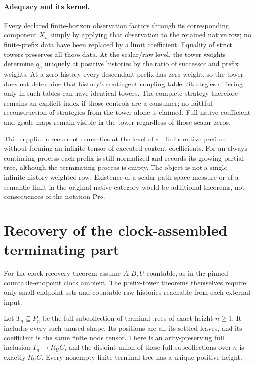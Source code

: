 \documentclass[11pt]{article}
\begin{document}
\paragraph{Adequacy and its kernel.}
Every declared finite-horizon observation factors through its corresponding component $X_n$ simply by applying that observation to the retained native row; no finite-prefix data have been replaced by a limit coefficient. Equality of strict towers preserves all those data. At the scalar/raw level, the tower weights determine $q_h$ uniquely at positive histories by the ratio of successor and prefix weights. At a zero history every descendant prefix has zero weight, so the tower does not determine that history's contingent coupling table. Strategies differing only in such tables can have identical towers. The complete strategy therefore remains an explicit index if those controls are a consumer; no faithful reconstruction of strategies from the tower alone is claimed. Full native coefficient and grade maps remain visible in the tower regardless of those scalar zeros.

This supplies a recurrent semantics at the level of all finite native prefixes without forming an infinite tensor of executed content coefficients. For an always-continuing process each prefix is still normalized and records its growing partial tree, although the terminating process is empty. The object is not a single infinite-history weighted row. Existence of a scalar path-space measure or of a semantic limit in the original native category would be additional theorems, not consequences of the notation $\mathrm{Pro}$.

\section{Recovery of the clock-assembled terminating part}
For the clock-recovery theorem assume $A,B,U$ countable, as in the pinned countable-endpoint clock ambient. The prefix-tower theorems themselves require only small endpoint sets and countable raw histories reachable from each external input.

Let $T_n\subseteq P_n$ be the full subcollection of terminal trees of exact height $n\geq1$. It includes every such unused shape. Its positions are all its settled leaves, and its coefficient is the same finite node tensor. There is an arity-preserving full inclusion $T_n\to R_UC$, and the disjoint union of these full subcollections over $n$ is exactly $R_UC$. Every nonempty finite terminal tree has a unique positive height.
\end{document}
